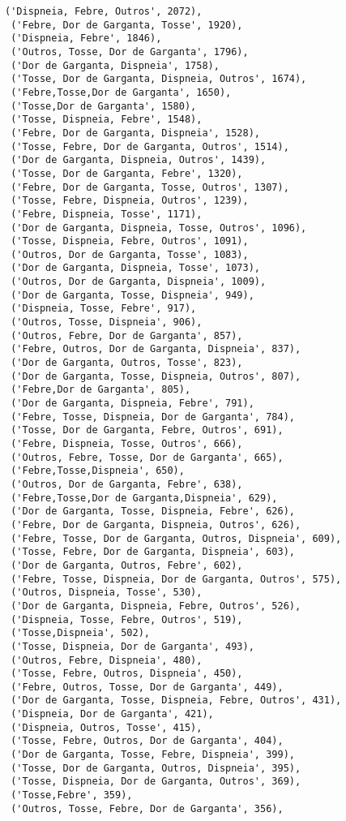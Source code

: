 \documentclass[11pt]{article}
\begin{document}
\begin{tcolorbox}[breakable, size=fbox, boxrule=.5pt, pad at break*=1mm, opacityfill=0]
\begin{Verbatim}[commandchars=\\\{\}]
 ('Dispneia, Febre, Outros', 2072),
 ('Febre, Dor de Garganta, Tosse', 1920),
 ('Dispneia, Febre', 1846),
 ('Outros, Tosse, Dor de Garganta', 1796),
 ('Dor de Garganta, Dispneia', 1758),
 ('Tosse, Dor de Garganta, Dispneia, Outros', 1674),
 ('Febre,Tosse,Dor de Garganta', 1650),
 ('Tosse,Dor de Garganta', 1580),
 ('Tosse, Dispneia, Febre', 1548),
 ('Febre, Dor de Garganta, Dispneia', 1528),
 ('Tosse, Febre, Dor de Garganta, Outros', 1514),
 ('Dor de Garganta, Dispneia, Outros', 1439),
 ('Tosse, Dor de Garganta, Febre', 1320),
 ('Febre, Dor de Garganta, Tosse, Outros', 1307),
 ('Tosse, Febre, Dispneia, Outros', 1239),
 ('Febre, Dispneia, Tosse', 1171),
 ('Dor de Garganta, Dispneia, Tosse, Outros', 1096),
 ('Tosse, Dispneia, Febre, Outros', 1091),
 ('Outros, Dor de Garganta, Tosse', 1083),
 ('Dor de Garganta, Dispneia, Tosse', 1073),
 ('Outros, Dor de Garganta, Dispneia', 1009),
 ('Dor de Garganta, Tosse, Dispneia', 949),
 ('Dispneia, Tosse, Febre', 917),
 ('Outros, Tosse, Dispneia', 906),
 ('Outros, Febre, Dor de Garganta', 857),
 ('Febre, Outros, Dor de Garganta, Dispneia', 837),
 ('Dor de Garganta, Outros, Tosse', 823),
 ('Dor de Garganta, Tosse, Dispneia, Outros', 807),
 ('Febre,Dor de Garganta', 805),
 ('Dor de Garganta, Dispneia, Febre', 791),
 ('Febre, Tosse, Dispneia, Dor de Garganta', 784),
 ('Tosse, Dor de Garganta, Febre, Outros', 691),
 ('Febre, Dispneia, Tosse, Outros', 666),
 ('Outros, Febre, Tosse, Dor de Garganta', 665),
 ('Febre,Tosse,Dispneia', 650),
 ('Outros, Dor de Garganta, Febre', 638),
 ('Febre,Tosse,Dor de Garganta,Dispneia', 629),
 ('Dor de Garganta, Tosse, Dispneia, Febre', 626),
 ('Febre, Dor de Garganta, Dispneia, Outros', 626),
 ('Febre, Tosse, Dor de Garganta, Outros, Dispneia', 609),
 ('Tosse, Febre, Dor de Garganta, Dispneia', 603),
 ('Dor de Garganta, Outros, Febre', 602),
 ('Febre, Tosse, Dispneia, Dor de Garganta, Outros', 575),
 ('Outros, Dispneia, Tosse', 530),
 ('Dor de Garganta, Dispneia, Febre, Outros', 526),
 ('Dispneia, Tosse, Febre, Outros', 519),
 ('Tosse,Dispneia', 502),
 ('Tosse, Dispneia, Dor de Garganta', 493),
 ('Outros, Febre, Dispneia', 480),
 ('Tosse, Febre, Outros, Dispneia', 450),
 ('Febre, Outros, Tosse, Dor de Garganta', 449),
 ('Dor de Garganta, Tosse, Dispneia, Febre, Outros', 431),
 ('Dispneia, Dor de Garganta', 421),
 ('Dispneia, Outros, Tosse', 415),
 ('Tosse, Febre, Outros, Dor de Garganta', 404),
 ('Dor de Garganta, Tosse, Febre, Dispneia', 399),
 ('Tosse, Dor de Garganta, Outros, Dispneia', 395),
 ('Tosse, Dispneia, Dor de Garganta, Outros', 369),
 ('Tosse,Febre', 359),
 ('Outros, Tosse, Febre, Dor de Garganta', 356),

\end{Verbatim}
\end{tcolorbox}
\end{document}

